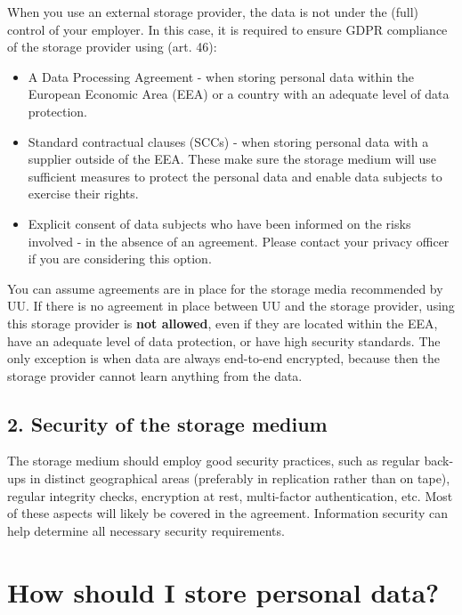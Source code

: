 \documentclass[
]{book}
\providecommand{\tightlist}{%
  \setlength{\itemsep}{0pt}\setlength{\parskip}{0pt}}
\begin{document}
When you use an external storage provider, the data is not under the (full)
control of your employer. In this case, it is required to ensure GDPR compliance
of the storage provider using
(art. 46):

\begin{itemize}
\tightlist
\item
  A Data Processing Agreement -
  when storing personal data within the European Economic Area (EEA) or a
  country with an
  adequate level of data protection.
\item
  Standard
  contractual clauses (SCCs) - when storing personal data with a
  supplier outside of the EEA. These make sure the storage medium will use
  sufficient measures to protect the personal data and enable data subjects to
  exercise their rights.
\item
  Explicit consent of data subjects who have been informed on the risks
  involved - in the absence of an agreement. Please contact your
  privacy officer
  if you are considering this option.
\end{itemize}

You can assume agreements are in place for the storage media recommended by UU.
If there is no agreement in place between UU and the storage provider, using
this storage provider is \textbf{not allowed}, even if they are located within the EEA,
have an adequate level of data protection, or have high security standards. The
only exception is when data are always end-to-end encrypted, because then the
storage provider cannot learn anything from the data.

\hypertarget{security-of-the-storage-medium}{%
\subsection{2. Security of the storage medium}\label{security-of-the-storage-medium}}

The storage medium should employ good security practices, such as regular back-ups
in distinct geographical areas (preferably in replication rather than on tape),
regular integrity checks, encryption at rest, multi-factor authentication, etc.
Most of these aspects will likely be covered in the agreement. Information
security can help determine all necessary security requirements.

\hypertarget{data-storage-how}{%
\section{How should I store personal data?}\label{data-storage-how}}
\end{document}
